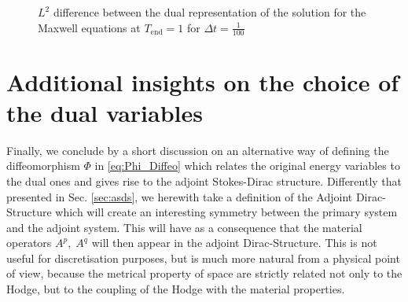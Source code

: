 \documentclass{elsarticle}
\begin{document}
\begin{figure}[p]%
\centering
{}%
\hspace{8pt}%
%
\caption{$L^2$ difference between the dual representation of the solution for the Maxwell equations at $T_{\text{end}}=1$ for $\Delta t = \frac{1}{100}$}%
\label{fig:diff_dual_maxwell}%
\end{figure}


\section{Additional insights on the choice of the dual variables \label{sec:additionalinsights}}
Finally, we conclude by a short discussion on an alternative way of defining the diffeomorphism $\Phi$ in \eqref{eq:Phi_Diffeo} which relates the original energy variables to the dual ones and gives rise to the adjoint Stokes-Dirac structure.
Differently that presented in Sec. \ref{sec:asds}, we herewith take a definition of the Adjoint Dirac-Structure which will create an interesting symmetry between the primary system and the adjoint system. This will have as a consequence that the material operators $A^p, \; A^q$ will then appear in the adjoint Dirac-Structure. This is not useful for discretisation purposes, but is much more natural from a physical point of view, because the metrical property of space are strictly related not only to the Hodge, but to the coupling of the Hodge with the material properties.
\end{document}
